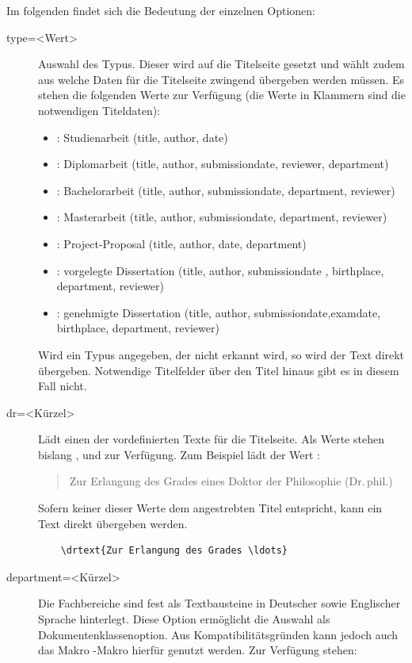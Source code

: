 Im folgenden findet sich die Bedeutung der einzelnen Optionen:
\begin{description}
\item[type=<Wert>] Auswahl des Typus. Dieser wird auf die Titelseite gesetzt und wählt zudem aus welche Daten für die Titelseite zwingend übergeben werden müssen.
	Es stehen die folgenden Werte zur Verfügung (die Werte in Klammern sind die notwendigen Titeldaten):
	\begin{itemize}
	\item {}: Studienarbeit (title, author, date)
	\item {}: Diplomarbeit (title, author, submissiondate, reviewer, department)
	\item {}: Bachelorarbeit (title, author, submissiondate, department, reviewer)
	\item {}: Masterarbeit (title, author, submissiondate, department, reviewer)
	\item {}: Project-Proposal  (title, author, date, department)
	\item {}: vorgelegte Dissertation (title, author, submissiondate , birthplace, department, reviewer)
	\item {}: genehmigte Dissertation (title, author, submissiondate,examdate, birthplace, department, reviewer)
	\end{itemize}
	Wird ein Typus angegeben, der nicht erkannt wird, so wird der Text direkt übergeben. Notwendige Titelfelder über den Titel hinaus gibt es in diesem Fall nicht.
\item[dr=<Kürzel>] Lädt einen der vordefinierten Texte für die Titelseite. Als Werte stehen bislang ,  und  zur Verfügung. Zum Beispiel lädt der Wert :
	\begin{quote}
	Zur Erlangung des Grades eines Doktor der Philosophie (Dr.\,phil.)
	\end{quote}
	Sofern keiner dieser Werte dem angestrebten Titel entspricht, kann ein Text direkt übergeben werden.
	\begin{verbatim}
	\drtext{Zur Erlangung des Grades \ldots}
	\end{verbatim}
\item[department=<Kürzel>] Die Fachbereiche sind fest als Textbausteine in Deutscher sowie Englischer Sprache hinterlegt. Diese Option ermöglicht die Auswahl als Dokumentenklassenoption. Aus Kompatibilitätsgründen kann jedoch auch das Makro -Makro hierfür genutzt werden. Zur Verfügung stehen:\par

\end{description}
